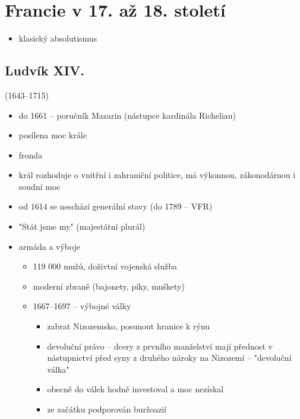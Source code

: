\section{Francie v 17. až 18. století}
\begin{itemize}
\item klasický absolutismus
\end{itemize}
\subsection{Ludvík XIV.}(1643--1715)
\begin{itemize}
\item do 1661 -- poručník Mazarin (nástupce kardinála Richeliau)
\item posílena moc krále 
\item fronda
\item král rozhoduje o vnitřní i zahraniční politice, má výkonnou, zákonodárnou i soudní moc
\item od 1614 se neschází generální stavy (do 1789 -- VFR)
\item "Stát jsme my" (majestátní plurál)
\item armáda a výboje
	\begin{itemize}
	\item 119 000 mužů, doživtní vojenská služba
	\item moderní zbraně (bajonety, píky, muškety)
	\item 1667--1697 -- výbojné války
		\begin{itemize}
		\item zabrat Nizozemsko, posunout hranice k rýnu
		\item devoluční právo -- dcery z prvního manželství mají přednost v nástupnictví před syny z druhého \ra nároky na Nizozemí -- "devoluční válka"
		\item obecně do válek hodně investoval a moc nezískal
		\item ze začátku podporován buržoazií
		\end{itemize}
	\end{itemize}
\end{itemize}

